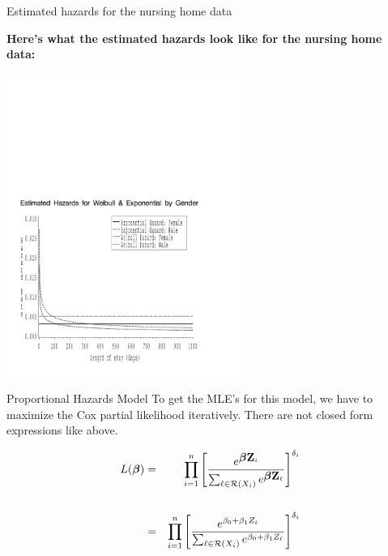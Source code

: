 \documentclass[envcountsect, 10pt, portrait, palatino]{beamer}
\newcommand{\bfbeta}{{\mbox{\boldmath$\beta$}}}
\newcommand{\bfZ}{{\mbox{{\bf Z}}}}
\begin{document}
\begin{frame}{Estimated hazards for the nursing home data}

{\bf Here's what the estimated hazards look like for the
nursing home data:}

\centerline{\includegraphics[width=3in]{weibhaz.pdf}}
\end{frame} 
\begin{frame}{ Proportional Hazards Model}
To get the MLE's for this model, we have to maximize the Cox partial
likelihood iteratively.  There are not closed form expressions like above.

\begin{eqnarray*}
L(\bfbeta) & = & \prod_{i=1}^{n}
\left[ \frac {e^{\bfbeta {\bfZ}_i }} {\sum_{\ell \in {\cal R}(X_i)}
    e^{\bfbeta {\bfZ}_\ell}} \right]^{\delta_i}\\[4ex]
& = & \prod_{i=1}^{n}
\left[ \frac {e^{\beta_0 + \beta_1 Z_i }} {\sum_{\ell \in {\cal R}(X_i)}
    e^{\beta_0 + \beta_1 Z_\ell}} \right]^{\delta_i}
\end{eqnarray*}
\end{frame} 
\end{document}
